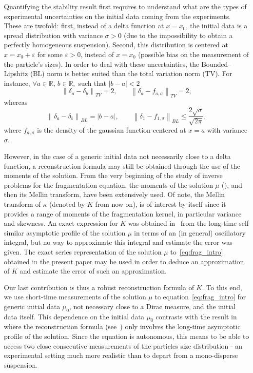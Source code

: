 \documentclass[AHL,Unicode,longabstracts,published]{cedram}
\newcommand*\eps{\varepsilon}
\newcommand*\R{\mathbb{R}}
\newcommand*\f{\frac}
\let\oldforall\forall
\renewcommand*{\forall}{\mathrel{\oldforall}}
\begin{document}
Quantifying the stability result first requires to understand what are the types of experimental uncertainties on the initial data coming from the experiments. These are twofold: first, instead of a delta function at $x=x_0$, the initial data is a spread distribution with variance $\sigma>0$ (due to the impossibility to obtain a perfectly homogeneous suspension). Second, this distribution is centered at $x=x_0+\eps$ for some $\eps>0$, instead of $x=x_0$ (possible bias on the measurement of the particle's
sizes). In order to deal with these uncertainties, the Bounded--Lipshitz (BL) norm is better suited than the total variation norm (TV). For instance, $\forall a\in \R,\,b\in \R,$ such that $|b-a| <2$
\begin{equation*}
\left\|\delta_{a}-\delta_b \right\|_{TV} =2,\qquad \left\|\delta_{a}-f_{a,\sigma}\right\|_{TV} =2,
\end{equation*}
whereas
\begin{equation*}
\left\|\delta_{a}-\delta_b \right\|_{BL} =|b-a|,\qquad \left\|\delta_{1}-f_{1,\sigma} \right\|_{BL} \leq\f{2\sqrt{\sigma}}{\sqrt{2\pi}},
\end{equation*}
where $f_{a,\sigma}$ is the density of the gaussian function centered at $x=a$ with variance $\sigma$.

However, in the case of a generic initial data not necessarily close to a delta function, a reconstruction formula may still be obtained through the use of the moments of the solution. From the very beginning of the study of inverse problems for the fragmentation equation, the moments of the solution $\mu $ (\cite{NRamG80,Ram74}), and then its Mellin transform, have been extensively used. Of note, the Mellin transform of $\kappa $ (denoted by $K$ from now on), is of interest by itself since it provides a range of moments of the fragmentation kernel, in particular variance and skewness. An exact expression for $K$ was obtained in~\cite{DET18} from the long-time self similar asymptotic profile of the solution $\mu $ in terms of an (in general) oscillatory integral, but no way to approximate this integral and estimate the error was given. The exact series representation of the solution $\mu $ to~\eqref{eq:frag_intro} obtained in the present paper may be used in order to deduce an approximation of $K$ and estimate the error of such an approximation.

Our last contribution is thus a robust reconstruction formula of $K$. To this end, we use short-time measurements of the solution $\mu $ to equation~\eqref{eq:frag_intro} for generic initial data $\mu _0$, not necessary close to a Dirac measure, and the initial data itself. This dependence on the initial data $\mu _0$ contrasts with the result in~\cite{DET18} where the reconstruction formula (see~\cite[Theorem~2]{DET18}) only involves the long-time asymptotic profile of the solution. Since the equation is autonomous, this means to be able to access two close consecutive measurements of the particles size distribution - an experimental setting much more realistic than to depart from a mono-disperse suspension.
\end{document}
